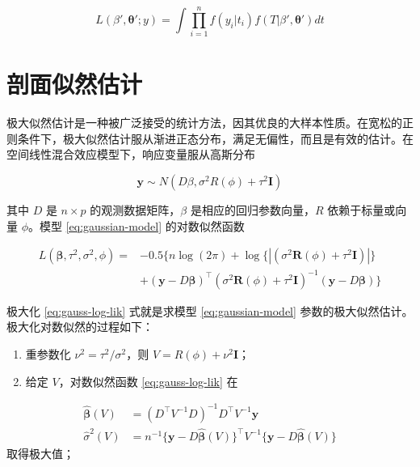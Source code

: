 \documentclass[12pt,a4paper,UTF8,twoside]{book}
\theoremstyle{definition}
\theoremstyle{definition}
\theoremstyle{definition}
\theoremstyle{remark}
\begin{document}
\begin{equation}
L(\beta',\boldsymbol{\theta}';y) = \int \prod_{i=1}^{n}f(y_i|t_i)f(T|\beta',\boldsymbol{\theta}')dt \label{eq:likelihood-function}
\end{equation}

\hypertarget{profile-likelihood}{%
\section{剖面似然估计}\label{profile-likelihood}}

极大似然估计是一种被广泛接受的统计方法，因其优良的大样本性质。在宽松的正则条件下，极大似然估计服从渐进正态分布，满足无偏性，而且是有效的估计。在空间线性混合效应模型下，响应变量服从高斯分布

\begin{equation}
\mathbf{y} \sim N(D\beta,\sigma^2 R(\phi) + \tau^2\mathbf{I})
\label{eq:gaussian-model}
\end{equation}

其中 \(D\) 是 \(n \times p\) 的观测数据矩阵，\(\beta\)
是相应的回归参数向量，\(R\) 依赖于标量或向量 \(\phi\)。模型
\eqref{eq:gaussian-model} 的对数似然函数

\begin{equation}
\begin{aligned}
L(\boldsymbol{\beta},\tau^2,\sigma^2,\phi) = {} 
 & - 0.5\{ n\log(2\pi) + \log\{|(\sigma^2\mathbf{R}(\phi)+\tau^2\mathbf{I})|\} \\
 & + (\mathbf{y} - D\boldsymbol{\beta})^{\top}(\sigma^2\mathbf{R}(\phi)+\tau^2\mathbf{I})^{-1}(\mathbf{y} - D\boldsymbol{\beta}) \}  
\end{aligned} \label{eq:gauss-log-lik}
\end{equation}

极大化 \eqref{eq:gauss-log-lik} 式就是求模型 \eqref{eq:gaussian-model}
参数的极大似然估计。极大化对数似然的过程如下：

\begin{enumerate}
\def\labelenumi{\arabic{enumi}.}
\item
  重参数化 \(\nu^2 = \tau^2/\sigma^2\)，则
  \(V = R(\phi) + \nu^2 \mathbf{I}\)；
\item
  给定 \(V\)，对数似然函数 \eqref{eq:gauss-log-lik} 在
\end{enumerate}

\begin{equation}
  \begin{aligned}
  \hat{\boldsymbol{\beta}}(V) & =  (D^{\top} V^{-1} D)^{-1} D^{\top} V^{-1}\mathbf{y} \\
  \hat{\sigma}^2(V)           & =  n^{-1} \{\mathbf{y} - D\hat{\boldsymbol{\beta}}(V)\}^{\top} V^{-1} \{\mathbf{y} - D\hat{\boldsymbol{\beta}}(V)\}
  \end{aligned} \label{eq:beta-sigma}
  \end{equation} 取得极大值；
\end{document}
